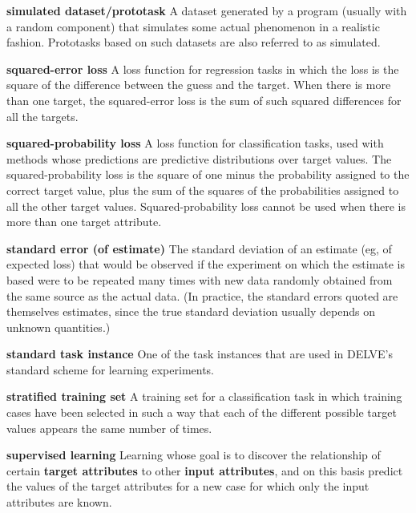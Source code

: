 \begin{list}{}{%
\setlength{\itemsep}{0in}%
\setlength{\leftmargin}{2.25in}%
\setlength{\labelsep}{0in}%
\setlength{\labelwidth}{2.25in}}
\item[\bf simulated dataset/prototask \hfill]
A dataset generated by a program (usually with a random component)
that simulates some actual phenomenon in a realistic fashion.
Prototasks based on such datasets are also referred to as simulated.

\item[\bf squared-error loss \hfill]
A loss function for regression tasks in which the loss is the
square of the difference between the guess and the
target.  When there is more than one target, the squared-error loss 
is the sum of such squared differences for all the targets.

\item[\bf squared-probability loss \hfill]
A loss function for classification tasks, used with methods 
whose predictions are predictive distributions over target values.
The squared-probability loss is the square of one minus the probability 
assigned to the correct target value, plus the sum of the squares of 
the probabilities assigned to all the other target values.  Squared-probability
loss cannot be used when there is more than one target attribute.

\item[\bf standard error (of estimate) \hfill]
The standard deviation of an estimate (eg, of expected loss) that
would be observed if the experiment on which the estimate is based
were to be repeated many times with new data randomly obtained
from the same source as the actual data.  (In practice, the
standard errors quoted are themselves estimates, since the 
true standard deviation usually depends on unknown quantities.)

\item[\bf standard task instance \hfill]
One of the task instances that are used in DELVE's standard scheme for learning 
experiments.

\item[\bf stratified training set \hfill]
A training set for a classification task in which training cases
have been selected in such a way that each of the different possible
target values appears the same number of times.

\item[\bf supervised learning \hfill]
Learning whose goal is to discover the relationship of certain
{\bf target attributes} to other {\bf input attributes}, and
on this basis predict the values of the target attributes for
a new case for which only the input attributes are known.


\end{list}
